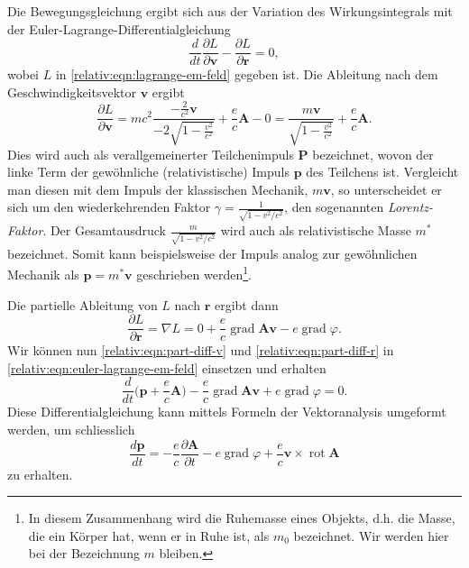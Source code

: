 Die Bewegungsgleichung ergibt sich aus der Variation des Wirkungsintegrals
mit der Euler-Lagrange-Differentialgleichung
\begin{equation}
    \frac{d}{dt} \frac{\partial L}{\partial \bm{v}} - \frac{\partial L}{\partial \bm{r}} = 0,
    \label{relativ:eqn:euler-lagrange-em-feld}
\end{equation}
wobei \(L\) in \eqref{relativ:eqn:lagrange-em-feld} gegeben ist.
Die Ableitung nach dem Geschwindigkeitsvektor \(\bm{v}\) ergibt
\begin{equation}
    \frac{\partial L}{\partial \bm{v}} =
    mc^2 \frac{-\frac{2}{c^2}\bm{v}}{-2\sqrt{1-\frac{v^2}{c^2}}}
    + \frac{e}{c} \bm{A} - 0
    = \frac{m \bm{v}}{\sqrt{1-\frac{v^2}{c^2}}} + \frac{e}{c} \bm{A}.
    \label{relativ:eqn:part-diff-v}
\end{equation}
Dies wird auch als verallgemeinerter Teilchenimpuls \(\bm{P}\) bezeichnet,
wovon der linke Term der gewöhnliche (relativistische) Impuls \(\bm{p}\)
des Teilchens ist.
Vergleicht man diesen mit dem Impuls der klassischen Mechanik, \(m\bm{v}\),
so unterscheidet er sich um den wiederkehrenden Faktor
\(\gamma=\frac{1}{\sqrt{1-v^2/c^2}}\), den sogenannten \emph{Lorentz-Faktor}.
%
Der Gesamtausdruck \(\frac{m}{\sqrt{1-v^2/c^2}}\) wird auch als
relativistische Masse \(m^*\) bezeichnet. Somit kann beispielsweise der
Impuls analog zur gewöhnlichen Mechanik als
\(\bm{p}=m^*\bm{v}\) geschrieben werden\footnote{
    In diesem Zusammenhang wird die Ruhemasse eines Objekts, d.h.
    die Masse, die ein Körper hat, wenn er in Ruhe ist,
    als \(m_0\) bezeichnet.
    Wir werden hier bei der Bezeichnung \(m\) bleiben.
}.

Die partielle Ableitung von \(L\) nach \(\bm{r}\) ergibt dann
\begin{equation}
    \frac{\partial L}{\partial \bm{r}} = \nabla L
    = 0 + \frac{e}{c} \operatorname{grad} \bm{Av} - e \operatorname{grad} \varphi.
    \label{relativ:eqn:part-diff-r}
\end{equation}
Wir können nun \eqref{relativ:eqn:part-diff-v} und \eqref{relativ:eqn:part-diff-r}
in \eqref{relativ:eqn:euler-lagrange-em-feld} einsetzen und erhalten
\begin{equation}
    \frac{d}{dt} \biggl(\bm{p} + \frac{e}{c} \bm{A}\biggr)
    - \frac{e}{c} \operatorname{grad} \bm{Av} + e \operatorname{grad} \varphi = 0.
    \label{relativ:eqn:euler-lagrange-em-eingesetzt}
\end{equation}
Diese Differentialgleichung kann mittels Formeln der Vektoranalysis
umgeformt werden, um schliesslich
\begin{equation}
    \frac{d\bm{p}}{dt} = -\frac{e}{c} \frac{\partial\bm{A}}{\partial t}
    - e \operatorname{grad} \varphi +
    \frac{e}{c} \bm{v} \times \operatorname{rot} \bm{A}
    \label{relativ:eqn:euler-lagrange-em-umgeformt}
\end{equation}
zu erhalten.

